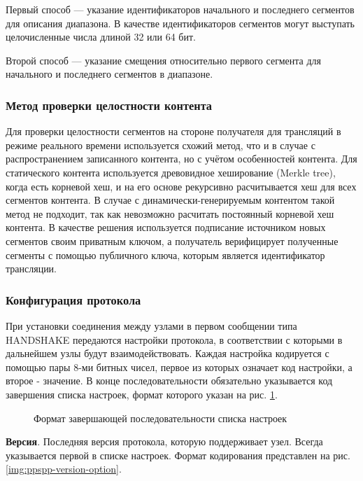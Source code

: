 		Первый способ --- указание идентификаторов начального и последнего сегментов для описания диапазона. В качестве
		идентификаторов сегментов могут выступать целочисленные числа длиной 32 или 64 бит.

		Второй способ --- указание смещения относительно первого сегмента для начального и последнего сегментов в
		диапазоне.

		\subsubsection{Метод проверки целостности контента}
		Для проверки целостности сегментов на стороне получателя для трансляций в режиме реального времени используется
		схожий метод, что и в случае с распространением записанного контента, но с учётом особенностей контента. Для
		статического контента используется древовидное хеширование (Merkle tree), когда есть корневой хеш, и на его
		основе рекурсивно расчитывается хеш для всех сегментов контента. В случае с динамически-генерируемым контентом
		такой метод не подходит, так как невозможно расчитать постоянный корневой хеш контента. В качестве решения
		используется подписание источником новых сегментов своим приватным ключом, а получатель верифицирует полученные
		сегменты с помощью публичного ключа, которым является идентификатор трансляции.

		\subsubsection{Конфигурация протокола}
		При установки соединения между узлами в первом сообщении типа HANDSHAKE передаются настройки протокола, в
		соответствии с которыми в дальнейшем узлы будут взаимодействовать. Каждая настройка кодируется с помощью пары
		8-ми битных чисел, первое из которых означает код настройки, а второе - значение. В конце последовательности
		обязательно указывается код завершения списка настроек, формат которого указан на рис.
		\ref{img:ppspp-end-option}.

		\begin{figure}[h]
			\caption{Формат завершающей последовательности списка настроек}
			\label{img:ppspp-end-option}
		\end{figure}

		\textbf{Версия}. Последняя версия протокола, которую поддерживает узел. Всегда указывается первой в списке
		настроек. Формат кодирования представлен на рис. \ref{img:ppspp-version-option}.

